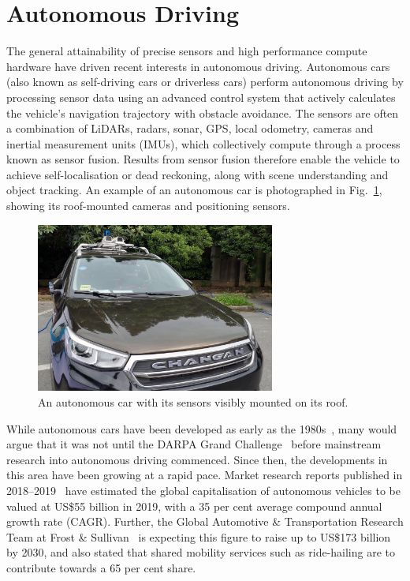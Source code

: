 \section{Autonomous Driving}
The general attainability of precise sensors and high performance compute hardware have driven recent interests in autonomous driving. Autonomous cars (also known as self-driving cars or driverless cars) perform autonomous driving by processing sensor data using an advanced control system that actively calculates the vehicle's navigation trajectory with obstacle avoidance. The sensors are often a combination of LiDARs, radars, sonar, GPS, local odometry, cameras and inertial measurement units (IMUs), which collectively compute through a process known as sensor fusion. Results from sensor fusion therefore enable the vehicle to achieve self-localisation or dead reckoning, along with scene understanding and object tracking. An example of an autonomous car is photographed in Fig.~\ref{fig:1:av}, showing its roof-mounted cameras and positioning sensors. 

\begin{figure}[ht] 
	\centering    
	\includegraphics[width=0.7\textwidth]{av}
	\caption{An autonomous car with its sensors visibly mounted on its roof.}
	\label{fig:1:av}
\end{figure}

While autonomous cars have been developed as early as the 1980s~\cite{dickmanns_autonomous_1987}, many would argue that it was not until the DARPA Grand Challenge~\cite{buehler_2005_2007} before mainstream research into autonomous driving commenced. Since then, the developments in this area have been growing at a rapid pace. Market research reports published in 2018--2019~\cite{grand_view_research_self-driving_2018, kumar_autonomous_2018, htf_market_intelligence_overview_2019} have estimated the global capitalisation of autonomous vehicles to be valued at US\$55 billion in 2019, with a 35 per cent average compound annual growth rate (CAGR). Further, the Global Automotive \& Transportation Research Team at Frost \& Sullivan~\cite{frost_&_sullivan_global_2018} is expecting this figure to raise up to US\$173 billion by 2030, and also stated that shared mobility services such as ride-hailing are to contribute towards a 65 per cent share. 

